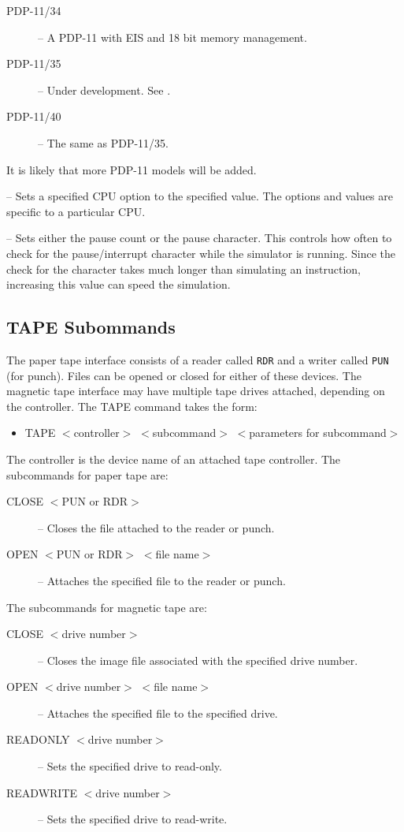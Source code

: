 \documentclass[10pt, openany]{book}
\begin{document}
\begin{description}
\begin{description}
    \item[PDP-11/34] -- A PDP-11 with EIS and 18 bit memory management.
    \item[PDP-11/35] -- Under development.  See \cite{dec75}.
    \item[PDP-11/40] -- The same as PDP-11/35.
  \end{description}
  It is likely that more PDP-11 models will be added.
  \item[OP-TIONS $<$option-name$>$ $<$option-value$>$] -- Sets a specified CPU option to the specified value.  The options and values are specific to a particular CPU.
  \item[PAUSE] -- Sets either the pause count or the pause character.  This controls how often to check for the pause/interrupt character while the simulator is running.  Since the check for the character takes much longer than simulating an instruction, increasing this value can speed the simulation.
\end{description}

\subsection{TAPE Subommands}
The paper tape interface consists of a reader called \verb|RDR| and a writer called \verb|PUN| (for punch).
Files can be opened or closed for either of these devices.
The magnetic tape interface may have multiple tape drives attached, depending on the controller.
The TAPE command takes the form:
\begin{itemize}
  \item TAPE $<$controller$>$ $<$subcommand$>$ $<$parameters for subcommand$>$
\end{itemize}
The controller is the device name of an attached tape controller.
The subcommands for paper tape are:
\begin{description}
  \item[CLOSE $<$PUN or RDR$>$]  -- Closes the file attached to the reader or punch.
  \item[OPEN $<$PUN or RDR$>$ $<$file name$>$] --  Attaches the specified file to the reader or punch.
\end{description}

The subcommands for magnetic tape are:
\begin{description}
  \item[CLOSE $<$drive number$>$] -- Closes the image file associated with the specified drive number.
  \item[OPEN $<$drive number$>$ $<$file name$>$] -- Attaches the specified file to the specified drive.
  \item[READONLY $<$drive number$>$] -- Sets the specified drive to read-only.
  \item[READWRITE $<$drive number$>$] -- Sets the specified drive to read-write.
\end{description}
\end{document}
